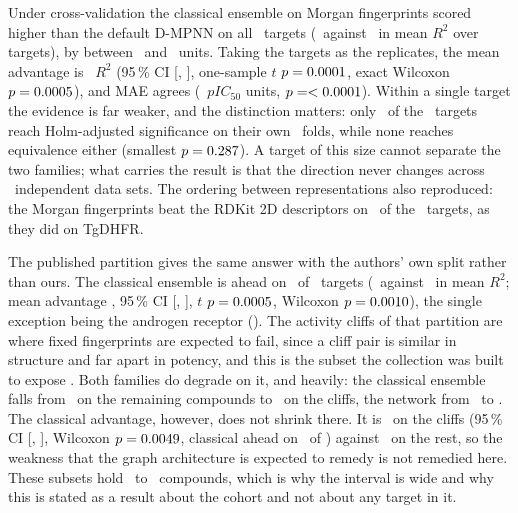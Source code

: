 Under cross-validation the classical ensemble on Morgan fingerprints scored higher than the default D-MPNN on all
\GenNTargets\ targets (\GenCvMorganRTwo\ against \GenCvGnnRTwo\ in mean $R^2$ over targets), by between
\GenCvAdvMin\ and \GenCvAdvMax\ units. Taking the targets as the replicates, the mean advantage is
\GenCvAdvMean\ $R^2$ (95\,\% CI [\GenCvAdvCILow, \GenCvAdvCIHigh], one-sample $t$ $p = 0.0001$, exact Wilcoxon
$p = 0.0005$), and MAE agrees (\GenCvMaeAdvMean\ $pIC_{50}$ units, $p = < 0.0001$). Within a single
target the evidence is far weaker, and the distinction matters: only \GenCvNHolm\ of the \GenNTargets\ targets reach
Holm-adjusted significance on their own \GenTotalOuterFolds\ folds, while none reaches equivalence either (smallest
$p = 0.287$). A target of this size cannot separate the two families; what carries the result is that the
direction never changes across \GenNTargets\ independent data sets. The ordering between representations also
reproduced: the Morgan fingerprints beat the RDKit 2D descriptors on \GenNMorganOverRdkit\ of the \GenNTargets\
targets, as they did on TgDHFR.

The published partition gives the same answer with the authors' own split rather than ours. The classical ensemble is
ahead on \GenHoldoutAdvNClassical\ of \GenNTargets\ targets (\GenHoldoutClassicalRTwo\ against
\GenHoldoutGnnRTwo\ in mean $R^2$; mean advantage \GenHoldoutAdvMean, 95\,\% CI [\GenHoldoutAdvCILow,
\GenHoldoutAdvCIHigh], $t$ $p = 0.0005$, Wilcoxon $p = 0.0010$), the single exception
being the androgen receptor (\GenArHoldoutAdv). The activity cliffs of that partition are where fixed fingerprints
are expected to fail, since a cliff pair is similar in structure and far apart in potency, and this is the subset the
collection was built to expose \citep{vantilborg2022}. Both families do degrade on it, and heavily: the classical
ensemble falls from \GenNonCliffClassicalRTwo\ on the remaining compounds to \GenCliffClassicalRTwo\ on the cliffs,
the network from \GenNonCliffGnnRTwo\ to \GenCliffGnnRTwo. The classical advantage, however, does not shrink there.
It is \GenCliffAdvMean\ on the cliffs (95\,\% CI [\GenCliffAdvCILow, \GenCliffAdvCIHigh], Wilcoxon
$p = 0.0049$, classical ahead on \GenCliffAdvNClassical\ of \GenNTargets) against
\GenNonCliffAdvMean\ on the rest, so the weakness that the graph architecture is expected to remedy is not remedied
here. These subsets hold \GenCliffNTestMin\ to \GenCliffNTestMax\ compounds, which is why the interval is wide and
why this is stated as a result about the cohort and not about any target in it.

